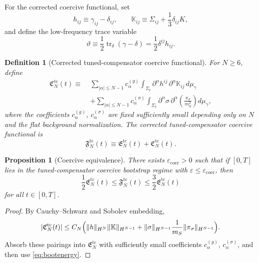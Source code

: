 \documentclass[11pt]{article}
\newtheorem{definition}{Definition}
\newtheorem{proposition}{Proposition}
\begin{document}
For the corrected coercive functional, set
\begin{equation}
h_{ij}\equiv \gamma_{ij}-\delta_{ij},
\qquad
\mathbb K_{ij}\equiv \Sigma_{ij}+\frac13\delta_{ij}K,
\label{eq:hk}
\end{equation}
and define the low-frequency trace variable
\begin{equation}
\vartheta \equiv \frac12\operatorname{tr}_\delta(\gamma-\delta)
=
\frac12\delta^{ij}h_{ij}.
\label{eq:vartheta}
\end{equation}

\begin{definition}[Corrected tuned-compensator coercive functional]
\label{def:F}
For \(N\ge 6\), define
\begin{align}
\mathfrak C_N^{\mathrm{tc}}(t)
\equiv\;&
\sum_{|\alpha|\le N-1} c_\alpha^{(g)}
\int_{\Sigma_t}
\partial^\alpha h^{ij}\,
\partial^\alpha \mathbb K_{ij}\,d\mu_\gamma
\nonumber\\
&+
\sum_{|\alpha|\le N-1} c_\alpha^{(\sigma)}
\int_{\Sigma_t}
\partial^\alpha \sigma\,
\partial^\alpha\!\left(\frac{\pi_\sigma}{m_S^2}\right)d\mu_\gamma,
\label{eq:Ctc}
\end{align}
where the coefficients \(c_\alpha^{(g)}\), \(c_\alpha^{(\sigma)}\) are fixed sufficiently small depending only on \(N\) and the flat background normalization. The \emph{corrected tuned-compensator coercive functional} is
\begin{equation}
\mathfrak F_N^{\mathrm{tc}}(t)
\equiv
\mathfrak E_N^{\mathrm{tc}}(t)+\mathfrak C_N^{\mathrm{tc}}(t).
\label{eq:Ftc}
\end{equation}
\end{definition}

\begin{proposition}[Coercive equivalence]
\label{prop:Fequiv}
There exists \(\varepsilon_{\mathrm{coer}}>0\) such that if \([0,T]\) lies in the tuned-compensator coercive bootstrap regime with \(\varepsilon\le \varepsilon_{\mathrm{coer}}\), then
\begin{equation}
\frac12\mathfrak E_N^{\mathrm{tc}}(t)
\le
\mathfrak F_N^{\mathrm{tc}}(t)
\le
\frac32\mathfrak E_N^{\mathrm{tc}}(t)
\label{eq:Fequiv}
\end{equation}
for all \(t\in[0,T]\).
\end{proposition}

\begin{proof}
By Cauchy--Schwarz and Sobolev embedding,
\[
|\mathfrak C_N^{\mathrm{tc}}(t)|
\le
C_N\Bigl(
\|h\|_{H^N}\|\mathbb K\|_{H^{N-1}}
+
\|\sigma\|_{H^{N-1}}\frac{1}{m_S}\|\pi_\sigma\|_{H^{N-1}}
\Bigr).
\]
Absorb these pairings into \(\mathfrak E_N^{\mathrm{tc}}\) with sufficiently small coefficients \(c_\alpha^{(g)}\), \(c_\alpha^{(\sigma)}\), and then use \eqref{eq:bootenergy}.
\end{proof}
\end{document}
